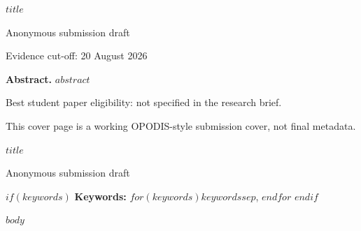 \documentclass[10pt,a4paper]{article}
\begin{document}
\begin{titlepage}
\centering
\vspace*{22mm}
{\LARGE\bfseries $title$\par}
\vspace{14mm}
{\large Anonymous submission draft\par}
\vspace{8mm}
{\small Evidence cut-off: 20 August 2026\par}
\vfill
\begin{minipage}{0.88\textwidth}
\textbf{Abstract.}
$abstract$
\end{minipage}
\vfill
{\small Best student paper eligibility: not specified in the research brief.\par}
{\small This cover page is a working OPODIS-style submission cover, not final metadata.\par}
\end{titlepage}

\begin{center}
{\LARGE\bfseries $title$\par}
\vspace{1.0em}
{\large Anonymous submission draft\par}
\end{center}

\begin{abstract}
$abstract$
\end{abstract}

$if(keywords)$
\noindent\textbf{Keywords:} $for(keywords)$$keywords$$sep$, $endfor$
\vspace{0.6em}
$endif$

$body$
\end{document}
